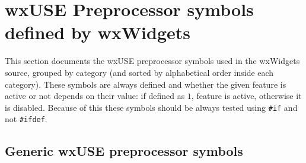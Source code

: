
\section{wxUSE Preprocessor symbols defined by wxWidgets}\label{wxusedef}

This section documents the wxUSE preprocessor symbols used in the wxWidgets
source, grouped by category (and sorted by alphabetical order inside each
category). These symbols are always defined and whether the given feature is
active or not depends on their value: if defined as $1$, feature is active,
otherwise it is disabled. Because of this these symbols should be always tested
using \texttt{#if} and not \texttt{#ifdef}.

\subsection{Generic wxUSE preprocessor symbols}\label{wxusedefmulti}

